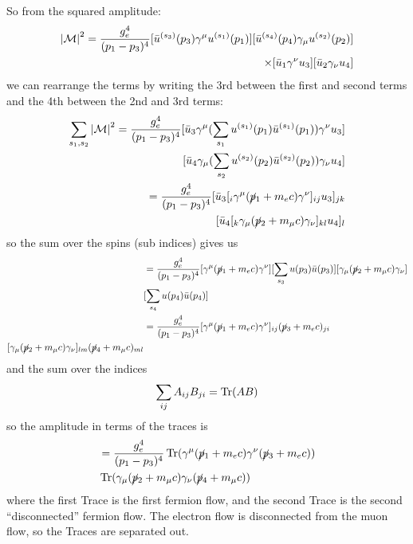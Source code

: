 \documentclass[../main.tex]{subfiles}
\begin{document}
So from the squared amplitude:
\begin{align*}
    \abs{\mathcal{M}}^2 = \frac{g_e^4}{(p_1 - p_3)^4} [\bar u^{(s_3)}(p_3) \gamma^\mu u^{(s_1)}(p_1)]
    [\bar u^{(s_4)}(p_4) \gamma_\mu u^{(s_2)}(p_2)] \\
    \times [\bar u_1 \gamma^\nu u_3]
    [\bar u_2 \gamma_\nu u_4]
\end{align*}
we can rearrange the terms by writing the 3rd between the first and second terms and the 4th between the 2nd and 3rd terms:
\begin{align*}
    \sum_{s_1,s_2} \abs{\mathcal{M}}^2 = \frac{g_e^4}{(p_1 - p_3)^4} 
    [\bar u_3 \gamma^\mu (\sum_{s_1} u^{(s_1)}(p_1) \bar u^{(s_1)}(p_1)) \gamma^\nu u_3] \\
    [\bar u_4 \gamma_\mu (\sum_{s_2} u^{(s_2)}(p_2) \bar u^{(s_2)}(p_2)) \gamma_\nu u_4] \\
    = \frac{g_e^4}{(p_1 - p_3)^4} [\bar u_3 [_i\gamma^\mu (\cancel{p}_1 + m_e c)\gamma^\nu]_{ij} u_3]_{jk} \\
        [\bar u_4 [_{k}\gamma_\mu (\cancel{p}_2 + m_\mu c)\gamma_\nu]_{kl} u_4]_l
\end{align*}
so the sum over the spins (sub indices) gives us
\begin{align*}
    &= \frac{g_e^4}{(p_1 - p_3)^4} [\gamma^\mu (\cancel{p}_1 + m_e c)\gamma^\nu] 
    [\sum_{s_3} u(p_3) \bar u(p_3)] [\gamma_\mu (\cancel{p}_2 + m_\mu c) \gamma_\nu] \\
    & [\sum_{s_4} u(p_4) \bar u(p_4)] \\
    &= \frac{g_e^4}{(p_1 - p_3)^4} [\gamma^\mu (\cancel{p}_1 + m_e c)\gamma^\nu]_{ij} (\cancel{p}_3 + m_e c)_{ji} \\
    [\gamma_\mu (\cancel{p}_2 + m_\mu c) \gamma_\nu]_{lm} (\cancel{p}_4 + m_\mu c)_{ml}
\end{align*}
and the sum over the indices
\begin{align*}
    \sum_{ij} A_{ij} B_{ji} = \Tr(AB)
\end{align*}
so the amplitude in terms of the traces is
\begin{align*}
    &= \frac{g_e^4}{(p_1 - p_3)^4} \Tr(\gamma^\mu (\cancel{p}_1 + m_e c)\gamma^\nu (\cancel{p}_3 + m_e c)) \\
    &\Tr(\gamma_\mu (\cancel{p}_2 + m_\mu c) \gamma_\nu (\cancel{p}_4 + m_\mu c))
\end{align*}
where the first Trace is the first fermion flow, and the second Trace is the second ``disconnected''
fermion flow. The electron flow is disconnected from the muon flow, so the Traces are separated out. 
\end{document}
